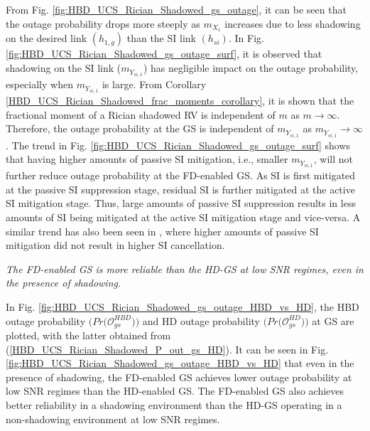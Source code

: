 From Fig. \ref{fig:HBD_UCS_Rician_Shadowed_gs_outage}, it can be seen that the outage probability drops more steeply as $m_{X_1}$ increases due to less shadowing on the desired link $(h_{1,g})$ than the SI link $(h_{si})$. In Fig. \ref{fig:HBD_UCS_Rician_Shadowed_gs_outage_surf}, it is observed that shadowing on the SI link ($m_{Y_{si,1}}$) has negligible impact on the outage probability, especially when $m_{Y_{si,1}}$ is large. From Corollary \ref{HBD_UCS_Rician_Shadowed_frac_moments_corollary}, it is shown that the fractional moment of a Rician shadowed RV is independent of $m$ as $m \to \infty$. Therefore, the outage probability at the GS is independent of $m_{Y_{si,1}}$ as $m_{Y_{si,1}} \to \infty$. The trend in Fig. \ref{fig:HBD_UCS_Rician_Shadowed_gs_outage_surf} shows that having higher amounts of passive SI mitigation, i.e., smaller $m_{Y_{si,1}}$, will not further reduce outage probability at the FD-enabled GS. As SI is first mitigated at the passive SI suppression stage, residual SI is further mitigated at the active SI mitigation stage. Thus, large amounts of passive SI suppression results in less amounts of SI being mitigated at the active SI mitigation stage and vice-versa. A similar trend has also been seen in \cite[Fig. 9]{sahai2013impact}, where higher amounts of passive SI mitigation did not result in higher SI cancellation.


\begin{observation}
\emph{\emph{The FD-enabled GS is more reliable than the HD-GS at low SNR regimes, even in the presence of shadowing.}
}\end{observation}

In Fig. \ref{fig:HBD_UCS_Rician_Shadowed_gs_outage_HBD_vs_HD}, the HBD outage probability $\big(Pr\big(\mathcal{O}_{gs}^{HBD}\big)\big)$ and HD outage probability $\big(Pr\big(\mathcal{O}_{gs}^{HD}\big)\big)$ at GS are plotted, with the latter obtained from (\ref{HBD_UCS_Rician_Shadowed_P_out_gs_HD}). It can be seen in Fig. \ref{fig:HBD_UCS_Rician_Shadowed_gs_outage_HBD_vs_HD} that even in the presence of shadowing, the FD-enabled GS achieves lower outage probability at low SNR regimes than the HD-enabled GS. The FD-enabled GS also achieves better reliability in a shadowing environment than the HD-GS operating in a non-shadowing environment at low SNR regimes.    


